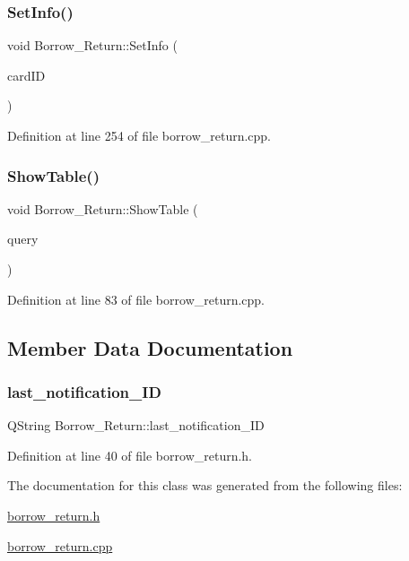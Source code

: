 \mbox{\label{class_borrow___return_afd3bfd00077c0704c8b26f8e4254e176}} 
\subsubsection{\texorpdfstring{SetInfo()}{SetInfo()}}
{\footnotesize\ttfamily void Borrow\+\_\+\+Return\+::\+Set\+Info (\begin{DoxyParamCaption}\item[{Q\+String}]{card\+ID }\end{DoxyParamCaption})}



Definition at line 254 of file borrow\+\_\+return.\+cpp.

\mbox{\label{class_borrow___return_a061bb2484dacfe92218acb7d6e9494e5}} 
\subsubsection{\texorpdfstring{ShowTable()}{ShowTable()}}
{\footnotesize\ttfamily void Borrow\+\_\+\+Return\+::\+Show\+Table (\begin{DoxyParamCaption}\item[{Q\+Sql\+Query}]{query }\end{DoxyParamCaption})}



Definition at line 83 of file borrow\+\_\+return.\+cpp.



\subsection{Member Data Documentation}
\mbox{\label{class_borrow___return_ab0439e8a8c1c061b43bc4e57d8a4a491}} 
\subsubsection{\texorpdfstring{last\_notification\_ID}{last\_notification\_ID}}
{\footnotesize\ttfamily Q\+String Borrow\+\_\+\+Return\+::last\+\_\+notification\+\_\+\+ID}



Definition at line 40 of file borrow\+\_\+return.\+h.



The documentation for this class was generated from the following files\+:\begin{DoxyCompactItemize}
\item 
\mbox{\hyperlink{borrow__return_8h}{borrow\+\_\+return.\+h}}\item 
\mbox{\hyperlink{borrow__return_8cpp}{borrow\+\_\+return.\+cpp}}\end{DoxyCompactItemize}
